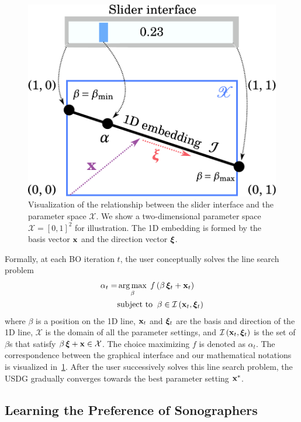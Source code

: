 \begin{figure}[t]
  \centering
  \includegraphics[scale=0.35]{figures/linesearch.pdf}
  \caption{Visualization of the relationship between the slider interface and the parameter space \(\mathcal{X}\).
    We show a two-dimensional parameter space \(\mathcal{X} = {[0, 1]}^2\) for illustration.
    The 1D embedding is formed by the basis vector \(\mathbf{x}\) and the direction vector \(\bm{\xi}\).
  }\label{fig:linesearch}
  \vspace{-0.15in}
\end{figure}
%
Formally, at each BO iteration \(t\), the user conceptually solves the line search problem
\begin{align}
 \alpha_t = &\operatorname*{arg\,max}_{ \beta }\; f\,(\beta\,\bm{\xi}_t + \mathbf{x}_t) \label{eq:line_search}\\
 &\text{subject to}\;\; \beta \in \mathcal{I}\left(\mathbf{x}_t, \bm{\xi}_t\right) \nonumber
\end{align}
{\noindent}where \(\beta\) is a position on the 1D line, \(\mathbf{x}_t\) and \(\bm{\xi}_t\) are the basis and direction of the 1D line, \(\mathcal{X}\) is the domain of all the parameter settings, and \(\mathcal{I}\left(\mathbf{x}_t, \bm{\xi}_t\right)\) is the set of \(\beta\)s that satisfy \(\beta\,\bm{\xi} + \mathbf{x}  \in \mathcal{X}\).
The choice maximizing \(f\) is denoted as \(\alpha_t\).
The correspondence between the graphical interface and our mathematical notations is visualized in~\cref{fig:linesearch}.
After the user successively solves this line search problem, the USDG gradually converges towards the best parameter setting \(\mathbf{x}^{*}\).

\subsection{Learning the Preference of Sonographers}\label{section:gp}
